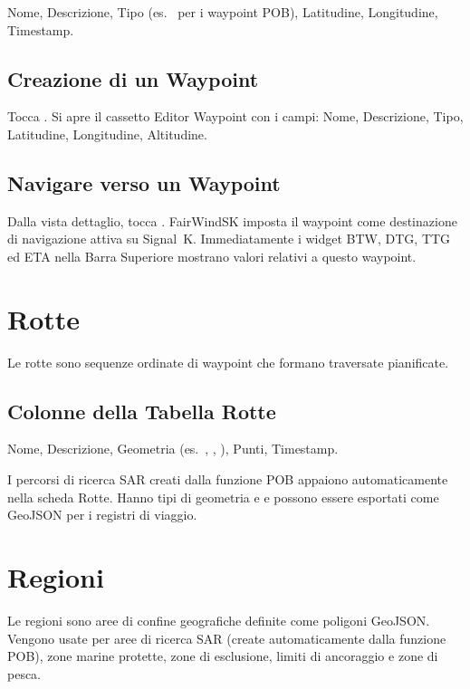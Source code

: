 Nome, Descrizione, Tipo (es.\  per i waypoint POB), Latitudine, Longitudine,
Timestamp.

\section{Creazione di un Waypoint}

Tocca . Si apre il cassetto Editor Waypoint con i campi: Nome, Descrizione, Tipo,
Latitudine, Longitudine, Altitudine.

\section{Navigare verso un Waypoint}

Dalla vista dettaglio, tocca .
FairWindSK imposta il waypoint come destinazione di navigazione attiva su Signal~K.
Immediatamente i widget BTW, DTG, TTG ed ETA nella Barra Superiore mostrano valori
relativi a questo waypoint.

\chapter{Rotte}
\label{ch:rotte}

Le rotte sono sequenze ordinate di waypoint che formano traversate pianificate.


\section{Colonne della Tabella Rotte}

Nome, Descrizione, Geometria (es.\ , , ),
Punti, Timestamp.

\begin{tipbox}
I percorsi di ricerca SAR creati dalla funzione POB appaiono automaticamente nella
scheda Rotte. Hanno tipi di geometria  e  e possono
essere esportati come GeoJSON per i registri di viaggio.
\end{tipbox}

\chapter{Regioni}
\label{ch:regioni}

Le regioni sono aree di confine geografiche definite come poligoni GeoJSON.
Vengono usate per aree di ricerca SAR (create automaticamente dalla funzione POB),
zone marine protette, zone di esclusione, limiti di ancoraggio e zone di pesca.

